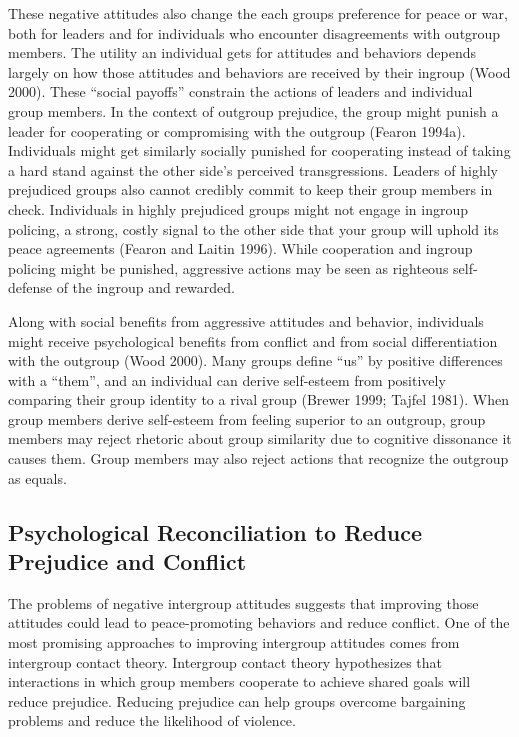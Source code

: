 \documentclass[11pt]{article}
\begin{document}
These negative attitudes also change the each groups preference for
peace or war, both for leaders and for individuals who encounter
disagreements with outgroup members. The utility an individual gets for
attitudes and behaviors depends largely on how those attitudes and
behaviors are received by their ingroup (Wood 2000). These ``social
payoffs'' constrain the actions of leaders and individual group members.
In the context of outgroup prejudice, the group might punish a leader
for cooperating or compromising with the outgroup (Fearon 1994a).
Individuals might get similarly socially punished for cooperating
instead of taking a hard stand against the other side's perceived
transgressions. Leaders of highly prejudiced groups also cannot credibly
commit to keep their group members in check. Individuals in highly
prejudiced groups might not engage in ingroup policing, a strong, costly
signal to the other side that your group will uphold its peace
agreements (Fearon and Laitin 1996). While cooperation and ingroup
policing might be punished, aggressive actions may be seen as righteous
self-defense of the ingroup and rewarded.

Along with social benefits from aggressive attitudes and behavior,
individuals might receive psychological benefits from conflict and from
social differentiation with the outgroup (Wood 2000). Many groups define
``us'' by positive differences with a ``them'', and an individual can
derive self-esteem from positively comparing their group identity to a
rival group (Brewer 1999; Tajfel 1981). When group members derive
self-esteem from feeling superior to an outgroup, group members may
reject rhetoric about group similarity due to cognitive dissonance it
causes them. Group members may also reject actions that recognize the
outgroup as equals.

\subsection{Psychological Reconciliation to Reduce Prejudice and
Conflict}\label{psychological-reconciliation-to-reduce-prejudice-and-conflict}

The problems of negative intergroup attitudes suggests that improving
those attitudes could lead to peace-promoting behaviors and reduce
conflict. One of the most promising approaches to improving intergroup
attitudes comes from intergroup contact theory. Intergroup contact
theory hypothesizes that interactions in which group members cooperate
to achieve shared goals will reduce prejudice. Reducing prejudice can
help groups overcome bargaining problems and reduce the likelihood of
violence.
\end{document}
